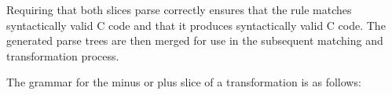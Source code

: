 \noindent
Requiring that both slices parse correctly ensures that the rule matches
syntactically valid C code and that it produces syntactically valid C code.
The generated parse trees are then merged for use in the subsequent
matching and transformation process.

The grammar for the minus or plus slice of a transformation is as follows:

\begin{grammar}





%
%






\end{grammar}
